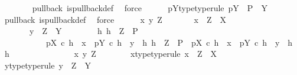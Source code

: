 \begin{isabellebody}
\ \ \ \ \ \ \isamarkupfalse%
\ pullback\ is{\isacharunderscore}{\kern0pt}pullback{\isacharunderscore}{\kern0pt}def\ \isamarkupfalse%
\ force\isanewline
\ \ \ \ \isamarkupfalse%
\ pY{\isacharunderscore}{\kern0pt}type{\isacharbrackleft}{\kern0pt}type{\isacharunderscore}{\kern0pt}rule{\isacharbrackright}{\kern0pt}{\isacharcolon}{\kern0pt}\ {\isachardoublequoteopen}pY\ {\isacharcolon}{\kern0pt}\ P\ {\isasymrightarrow}\ Y{\isachardoublequoteclose}\isanewline
\ \ \ \ \ \ \isamarkupfalse%
\ pullback\ is{\isacharunderscore}{\kern0pt}pullback{\isacharunderscore}{\kern0pt}def\ \isamarkupfalse%
\ force\isanewline
\ \ \ \ \isamarkupfalse%
\ {\isachardoublequoteopen}{\isasymAnd}x\ y\ Z{\isachardot}{\kern0pt}\isanewline
\ \ \ \ \ \ \ x\ {\isacharcolon}{\kern0pt}\ Z\ {\isasymrightarrow}\ X\ {\isasymLongrightarrow}\isanewline
\ \ \ \ \ \ \ y\ {\isacharcolon}{\kern0pt}\ Z\ {\isasymrightarrow}\ Y\ {\isasymLongrightarrow}\isanewline
\ \ \ \ \ \ \ {\isasymexists}h{\isachardot}{\kern0pt}\ h\ {\isacharcolon}{\kern0pt}\ Z\ {\isasymrightarrow}\ P\ {\isasymand}\isanewline
\ \ \ \ \ \ \ \ \ \ \ pX\ {\isasymcirc}\isactrlsub c\ h\ {\isacharequal}{\kern0pt}\ x\ {\isasymand}\ pY\ {\isasymcirc}\isactrlsub c\ h\ {\isacharequal}{\kern0pt}\ y\ {\isasymand}\ {\isacharparenleft}{\kern0pt}{\isasymforall}h{}{\isachardot}{\kern0pt}\ h{}\ {\isacharcolon}{\kern0pt}\ Z\ {\isasymrightarrow}\ P\ {\isasymand}\ pX\ {\isasymcirc}\isactrlsub c\ h{}\ {\isacharequal}{\kern0pt}\ x\ {\isasymand}\ pY\ {\isasymcirc}\isactrlsub c\ h{}\ {\isacharequal}{\kern0pt}\ y\ {\isasymlongrightarrow}\ h{}\ {\isacharequal}{\kern0pt}\ h{\isacharparenright}{\kern0pt}{\isachardoublequoteclose}\isanewline
\ \ \ \ \isamarkupfalse%
\ {\isacharminus}{\kern0pt}\ \isanewline
\ \ \ \ \ \ \isamarkupfalse%
\ x\ y\ Z\isanewline
\ \ \ \ \ \ \isamarkupfalse%
\ x{\isacharunderscore}{\kern0pt}type{\isacharbrackleft}{\kern0pt}type{\isacharunderscore}{\kern0pt}rule{\isacharbrackright}{\kern0pt}{\isacharcolon}{\kern0pt}\ {\isachardoublequoteopen}x\ {\isacharcolon}{\kern0pt}\ Z\ {\isasymrightarrow}\ X{\isachardoublequoteclose}\isanewline
\ \ \ \ \ \ \isamarkupfalse%
\ y{\isacharunderscore}{\kern0pt}type{\isacharbrackleft}{\kern0pt}type{\isacharunderscore}{\kern0pt}rule{\isacharbrackright}{\kern0pt}{\isacharcolon}{\kern0pt}\ {\isachardoublequoteopen}y\ {\isacharcolon}{\kern0pt}\ Z\ {\isasymrightarrow}\ Y{\isachardoublequoteclose}\isanewline

\end{isabellebody}
